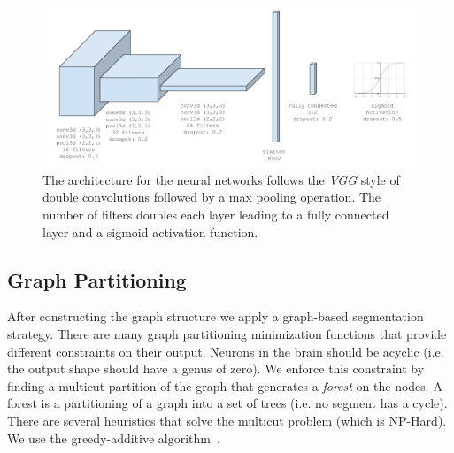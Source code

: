 \begin{figure}[t]
	\centering
	\includegraphics[width=0.95\linewidth]{figures/architecture.png}
	\caption{The architecture for the neural networks follows the \textit{VGG} style of double convolutions followed by a max pooling operation. The number of filters doubles each layer leading to a fully connected layer and a sigmoid activation function.}
	\label{fig:architecture}
\end{figure}

\subsection{Graph Partitioning}

After constructing the graph structure we apply a graph-based segmentation strategy.
There are many graph partitioning minimization functions that provide different constraints on their output.
Neurons in the brain should be acyclic (i.e. the output shape should have a genus of zero).
We enforce this constraint by finding a multicut partition of the graph that generates a \textit{forest} on the nodes.
A forest is a partitioning of a graph into a set of trees (i.e. no segment has a cycle).
There are several heuristics that solve the multicut problem (which is NP-Hard).
We use the greedy-additive algorithm~\cite{keuper2015efficient}.
